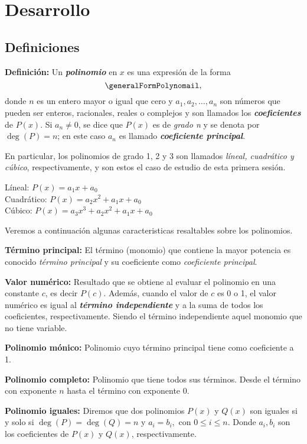 \section{Desarrollo}

\subsection{Definiciones}

\textbf{Definición:} Un \textbf{\emph{polinomio}} en $x$ es una expresión de la forma \[\generalFormPolynomail,\]
donde $n$ es un entero mayor o igual que cero y $a_1, a_2, \dots, a_n$ son números que pueden ser enteros,
racionales, reales o complejos y son llamados los \textbf{\emph{coeficientes}} de $P(x)$. Si $a_n \neq 0$,
se dice que $P(x)$ es de \emph{grado n} y se denota por $\deg{(P)} = n$; en este caso $a_n$ es llamado \textbf{\emph{coeficiente principal}}.

En particular, los polinomios de grado 1, 2 y 3 son llamados \emph{líneal, cuadrático y cúbico},
respectivamente, y son estos el caso de estudio de esta primera sesión.
\vspace{-2mm}
\begin{center}
    Líneal: $P(x) = a_1 x + a_0$\\
    Cuadrático: $P(x) = a_2 x^2 + a_1 x + a_0$\\
    Cúbico: $P(x) = a_3 x^3 + a_2 x^2 + a_1 x + a_0$
\end{center}

Veremos a continuación algunas caracteristicas resaltables sobre los polinomios.

\textbf{Término principal:} El término (monomio) que contiene la mayor potencia es conocido \emph{término principal} y su coeficiente como \emph{coeficiente principal}.

\textbf{Valor numérico:} Resultado que se obtiene al evaluar el polinomio en una constante $c$, es decir $P(c)$. Además, cuando el valor de $c$ es 0 o 1, el valor numérico
es igual al \textbf{\textit{término independiente}} y a la suma de todos los coeficientes, respectivamente. Siendo el término independiente aquel monomio que no tiene variable.

\textbf{Polinomio mónico:} Polinomio cuyo término principal tiene como coeficiente a 1.

\textbf{Polinomio completo:} Polinomio que tiene todos sus términos. Desde el término con exponente $n$ hasta el término con exponente 0.

\textbf{Polinomio iguales:} Diremos que dos polinomios $P(x)$ y $Q(x)$ son iguales si y solo si $\deg{(P)} = \deg{(Q)} = n$ y $a_i = b_i,$ con $0\leq i\leq n$. Donde $a_i, b_i$ son los coeficientes de $P(x)$ y $Q(x)$, respectivamente.

